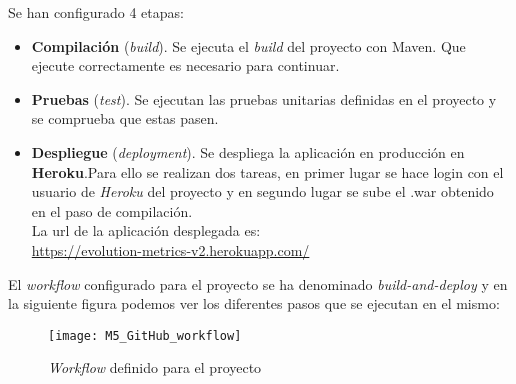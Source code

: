 Se han configurado 4 etapas:
\begin{itemize}
	\item \textbf{Compilación} (\textit{build}). Se ejecuta el \textit{build} del proyecto con Maven. Que  ejecute correctamente es necesario para continuar.
	\item \textbf{Pruebas} (\textit{test}). Se ejecutan las pruebas unitarias definidas en el proyecto y se comprueba que estas pasen.
	\item \textbf{Despliegue} (\textit{deployment}). Se despliega la aplicación en producción en \textbf{Heroku}.Para ello se realizan dos tareas, en primer lugar se hace login con el usuario de \textit{Heroku} del proyecto y en segundo lugar se sube el .war obtenido en el paso de compilación.\\
	
	 La url de la aplicación desplegada es:\\
	\url{https://evolution-metrics-v2.herokuapp.com/}
\end{itemize}

El \textit{workflow} configurado para el proyecto se ha denominado \textit{build-and-deploy} y en la siguiente figura podemos ver los diferentes pasos que se ejecutan en el mismo:

\begin{figure}[!h]
	\centering
	\texttt{[image: M5\_GitHub\_workflow]}
	\caption{\textit{Workflow} definido para el proyecto}\label{fig:M5_GitHub_workflow}
\end{figure}
\FloatBarrier

